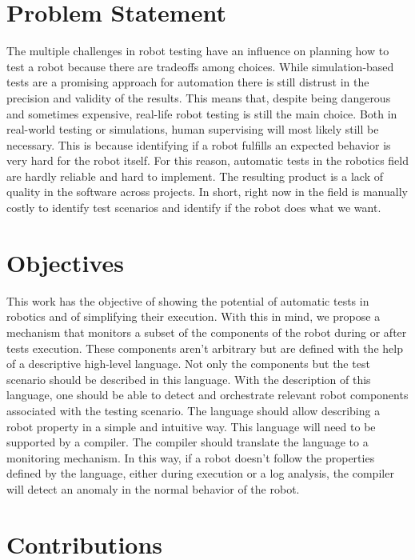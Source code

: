 \section{Problem Statement}
\label{sec:problem}

The multiple challenges in robot testing have an influence on planning 
how to test a robot because there are tradeoffs among choices.
While simulation-based tests are a promising approach for automation 
there is still distrust in the precision and validity of the results.
This means that, despite being dangerous and sometimes expensive, 
real-life robot testing is still the main choice.
Both in real-world testing or simulations, 
human supervising will most likely still be necessary.
This is because identifying if a robot fulfills an expected 
behavior is very hard for the robot itself.
For this reason, automatic tests in the robotics field are 
hardly reliable and hard to implement.
The resulting product is a lack of quality in the software 
across projects.
In short, right now in the field is manually costly to identify 
test scenarios and identify if the robot does what we want.


\section{Objectives}
\label{sec:objectives}

This work has the objective of showing the potential of automatic 
tests in robotics and of simplifying their execution.
With this in mind, we propose a mechanism that monitors a subset of 
the components of the robot during or after tests execution.
These components aren't arbitrary but are defined with the help of a descriptive high-level language.
Not only the components but the test scenario should be described in this language.
With the description of this language, one should be able to detect and 
orchestrate relevant robot components associated with the testing scenario.
The language should allow describing a robot property in a simple and intuitive way.
This language will need to be supported by a compiler. 
The compiler should translate the language to a monitoring mechanism.
In this way, if a robot doesn't follow the properties defined by the 
language, either during execution or a log analysis, the compiler will 
detect an anomaly in the normal behavior of the robot.


\section{Contributions}
\label{sec:contributions}

